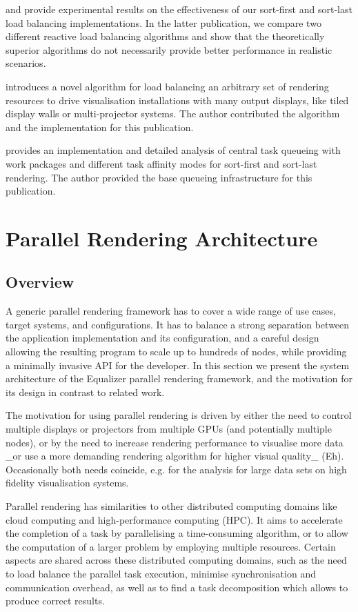 \cite{EMP:09} and \cite{ESP:18} provide experimental results on the
effectiveness of our sort-first and sort-last load balancing implementations.
In the latter publication, we compare two different reactive load balancing
algorithms and show that the theoretically superior algorithms do not necessarily
provide better performance in realistic scenarios.

\cite{EEP:11} introduces a novel algorithm for load balancing an arbitrary set
of rendering resources to drive visualisation installations with many output
displays, like tiled display walls or multi-projector systems. The author
contributed the algorithm and the implementation for this publication.

\cite{SPEP:16} provides an implementation and detailed analysis of central task
queueing with work packages and different task affinity modes for sort-first and
sort-last rendering. The author provided the base queueing infrastructure for
this publication.

\chapter{Parallel Rendering Architecture}\label{sArchitecture}

\section{Overview}
A generic parallel rendering framework has to cover a wide range of use cases,
target systems, and configurations. It has to balance a strong
separation between the application implementation and its configuration,
and a careful design allowing the resulting program to scale
up to hundreds of nodes, while providing a minimally invasive API for the
developer. In this section we present the system architecture of the Equalizer
parallel rendering framework, and the motivation for its design in contrast to related
work.

The motivation for using parallel rendering is driven by either the need to control
multiple displays or projectors from multiple GPUs (and potentially multiple
nodes), or by the need to increase rendering performance to visualise
more data _or use a more demanding rendering algorithm for higher visual quality_ (Eh).
Occasionally both needs coincide, e.g. for the analysis for large data
sets on high fidelity visualisation systems.

Parallel rendering has similarities to other distributed computing domains like
cloud computing and high-performance computing (HPC). It aims to accelerate
the completion of a task by parallelising a time-consuming algorithm, or to
allow the computation of a larger problem by employing multiple resources. Certain
aspects are shared across these distributed computing domains, such as the need
to load balance the parallel task execution, minimise synchronisation and
communication overhead, as well as to find a task decomposition which allows
to produce correct results.

